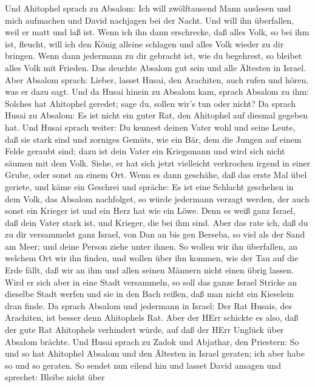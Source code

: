  Und Ahitophel sprach zu Absalom: Ich will zwölftausend Mann
auslesen und mich aufmachen und David nachjagen bei der Nacht.
 Und will ihn überfallen, weil er matt und laß ist. Wenn ich
ihn dann erschrecke, daß alles Volk, so bei ihm ist, fleucht, will ich
den König alleine schlagen  und alles Volk wieder zu dir
bringen. Wenn dann jedermann zu dir gebracht ist, wie du begehrest, so
bleibet alles Volk mit Frieden.  Das deuchte Absalom gut
sein und alle Ältesten in Israel.  Aber Absalom sprach:
Lieber, lasset Husai, den Arachiten, auch rufen und hören, was er dazu
sagt.  Und da Husai hinein zu Absalom kam, sprach Absalom zu
ihm: Solches hat Ahitophel geredet; sage du, sollen wir's tun oder
nicht?  Da sprach Husai zu Absalom: Es ist nicht ein guter
Rat, den Ahitophel auf diesmal gegeben hat.  Und Husai
sprach weiter: Du kennest deinen Vater wohl und seine Leute, daß sie
stark sind und zorniges Gemüts, wie ein Bär, dem die Jungen auf einem
Felde geraubt sind; dazu ist dein Vater ein Kriegsmann und wird sich
nicht säumen mit dem Volk.  Siehe, er hat sich jetzt
vielleicht verkrochen irgend in einer Grube, oder sonst an einem Ort.
Wenn es dann geschähe, daß das erste Mal übel geriete, und käme ein
Geschrei und spräche: Es ist eine Schlacht geschehen in dem Volk, das
Absalom nachfolget,  so würde jedermann verzagt werden, der
auch sonst ein Krieger ist und ein Herz hat wie ein Löwe. Denn es weiß
ganz Israel, daß dein Vater stark ist, und Krieger, die bei ihm sind.
 Aber das rate ich, daß du zu dir versammelst ganz Israel,
von Dan an bis gen Berseba, so viel als der Sand am Meer; und deine
Person ziehe unter ihnen.  So wollen wir ihn überfallen, an
welchem Ort wir ihn finden, und wollen über ihn kommen, wie der Tau auf
die Erde fällt, daß wir an ihm und allen seinen Männern nicht einen
übrig lassen.  Wird er sich aber in eine Stadt versammeln,
so soll das ganze Israel Stricke an dieselbe Stadt werfen und sie in den
Bach reißen, daß man nicht ein Kieselein dran finde.  Da
sprach Absalom und jedermann in Israel: Der Rat Husais, des Arachiten,
ist besser denn Ahitophels Rat. Aber der HErr schickte es also, daß der
gute Rat Ahitophels verhindert würde, auf daß der HErr Unglück über
Absalom brächte.  Und Husai sprach zu Zadok und Abjathar,
den Priestern: So und so hat Ahitophel Absalom und den Ältesten in
Israel geraten; ich aber habe so und so geraten.  So sendet
nun eilend hin und lasset David ansagen und sprechet: Bleibe nicht über
